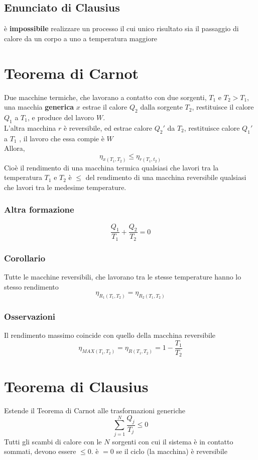 \documentclass[a4paper]{report}
\begin{document}
  \subsection{Enunciato di Clausius}
  è \textbf{impossibile} realizzare un processo il cui unico risultato sia il passaggio di calore da un corpo a uno a temperatura maggiore

  \section{Teorema di Carnot}
  Due macchine termiche, che lavorano a contatto con due sorgenti, $T_1$ e $T_2 > T_1$, una macchia \textbf{generica} $x$ estrae il calore $Q_2$ dalla sorgente $T_2$, restituisce il calore $Q_1$ a $T_1$, e produce del lavoro $W$. \\
  L'altra macchina $r$ è reversibile, ed estrae calore $Q_2'$ da $T_2$, restituisce calore $Q_1'$ a $T_1$ , il lavoro che essa compie è $W$\\
  Allora,
  $$ \eta_{x(T_1, T_2)}  \leq \eta_{r(T_1, t_2)} $$
  Cioè il rendimento di una macchina termica qualsiasi che lavori tra la temperatura $T_1$ e $T_2$ è $\leq$ del rendimento di una macchina reversibile qualsiasi che lavori tra le medesime temperature.
  \subsubsection{Altra formazione}
  $$ \frac{Q_1}{T_1} + \frac{Q_2}{T_2} = 0 $$

  \subsubsection{Corollario}
  Tutte le macchine reversibili, che lavorano tra le stesse temperature hanno lo stesso rendimento
  $$ \eta_{R_1(T_1, T_2)} = \eta_{R_2(T_1, T_2)} $$
  \subsubsection{Osservazioni}
  Il rendimento massimo coincide con quello della macchina reversibile
  $$ \eta_{MAX(T_1,T_2)} = \eta_{R(T_1,T_2)} = 1-\frac{T_1}{T_2} $$

  \section{Teorema di Clausius}
  Estende il Teorema di Carnot alle trasformazioni generiche
  $$ \sum_{j=1}^N \frac{Q_j}{T_j} \leq 0 $$
  Tutti gli scambi di calore con le $N$ sorgenti con cui il sistema è in contatto sommati, devono essere $\leq 0$. è $=0$ se il ciclo (la macchina) è reversibile
\end{document}
